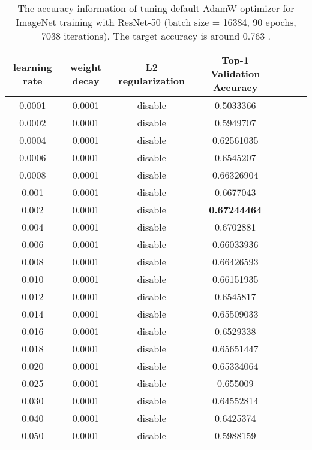 \documentclass{article} \usepackage{iclr2020_conference,times}
\begin{document}
\begin{table}[ht]
\renewcommand{\arraystretch}{1.3}
\caption{The accuracy information of tuning default AdamW optimizer for ImageNet training with ResNet-50 (batch size = 16384, 90 epochs, 7038 iterations). The target accuracy is around 0.763 \citep{goyal2017accurate}.}
\centering
\begin{tabular}{|c|c|c|c|c|c|c|}
\hline
learning rate & weight decay & L2 regularization & Top-1 Validation Accuracy\\
\hline
\hline
0.0001 & 0.0001 & disable & 0.5033366 \\
\hline
0.0002 & 0.0001 & disable & 0.5949707 \\
\hline
0.0004 & 0.0001 & disable & 0.62561035 \\
\hline
0.0006 & 0.0001 & disable & 0.6545207 \\
\hline
0.0008 & 0.0001 & disable & 0.66326904 \\
\hline
0.001 & 0.0001 & disable & 0.6677043 \\
\hline
0.002 & 0.0001 & disable & {\bf 0.67244464} \\
\hline
0.004 & 0.0001 & disable & 0.6702881 \\
\hline
0.006 & 0.0001 & disable & 0.66033936 \\
\hline
0.008 & 0.0001 & disable & 0.66426593 \\
\hline
0.010 & 0.0001 & disable & 0.66151935 \\
\hline
0.012 & 0.0001 & disable & 0.6545817 \\
\hline
0.014 & 0.0001 & disable & 0.65509033 \\
\hline
0.016 & 0.0001 & disable & 0.6529338 \\
\hline
0.018 & 0.0001 & disable & 0.65651447 \\
\hline
0.020 & 0.0001 & disable & 0.65334064 \\
\hline
0.025 & 0.0001 & disable & 0.655009 \\
\hline
0.030 & 0.0001 & disable & 0.64552814 \\
\hline
0.040 & 0.0001 & disable & 0.6425374 \\
\hline
0.050 & 0.0001 & disable & 0.5988159 \\
\hline
\end{tabular}
\label{table:imagenet_adamw_default_2}
\end{table}
\end{document}
